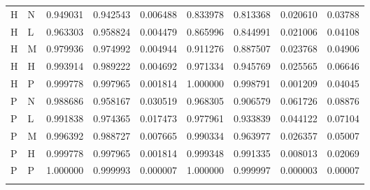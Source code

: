 \begin{table}[t]
\begin{tabular*}{\textwidth}{@{\extracolsep\fill}llccccccc@{}}
\midrule
H & N & 0.949031 & 0.942543 & 0.006488 & 0.833978 & 0.813368 & 0.020610 & 0.03788\\
H & L & 0.963303 & 0.958824 & 0.004479 & 0.865996 & 0.844991 & 0.021006 & 0.04108\\
H & M & 0.979936 & 0.974992 & 0.004944 & 0.911276 & 0.887507 & 0.023768 & 0.04906\\
H & H & 0.993914 & 0.989222 & 0.004692 & 0.971334 & 0.945769 & 0.025565 & 0.06646\\
H & P & 0.999778 & 0.997965 & 0.001814 & 1.000000 & 0.998791 & 0.001209 & 0.04045\\
\midrule
P & N & 0.988686 & 0.958167 & 0.030519 & 0.968305 & 0.906579 & 0.061726 & 0.08876\\
P & L & 0.991838 & 0.974365 & 0.017473 & 0.977961 & 0.933839 & 0.044122 & 0.07104\\
P & M & 0.996392 & 0.988727 & 0.007665 & 0.990334 & 0.963977 & 0.026357 & 0.05007\\
P & H & 0.999778 & 0.997965 & 0.001814 & 0.999348 & 0.991335 & 0.008013 & 0.02069\\
P & P & 1.000000 & 0.999993 & 0.000007 & 1.000000 & 0.999997 & 0.000003 & 0.00007\\
\botrule
\end{tabular*}
\end{table}
